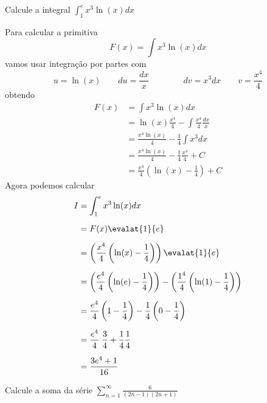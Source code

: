 \documentclass[a4paper,12pt,fleqn]{article}
\begin{document}
Calcule a integral
\(
\int_1^e x^3\ln(x) dx
\)

\begin{answer}
  Para calcular a primitiva
  \[
  F(x) = \int x^3\ln(x) dx
  \]
  vamos usar integração por partes com
  \[
  u = \ln(x) \qquad du = \frac{dx}{x} \qquad\qquad
  dv = x^3dx \qquad v = \frac{x^4}{4}
  \]
  obtendo
  \begin{align*}
    F(x)
    & = \int x^3\ln(x) dx \\[2mm]
    & = \ln(x)\frac{x^4}{4} - \int \frac{x^4}{4} \frac{dx}{x} \\[2mm]
    & = \frac{x^4\ln(x)}{4} - \frac{1}{4} \int x^3 dx  \\[2mm]
    & = \frac{x^4\ln(x)}{4} - \frac{1}{4} \frac{x^4}{4} + C  \\[2mm]
    & = \frac{x^4}{4}\left(\ln(x) - \frac{1}{4}\right) + C
  \end{align*}
  Agora podemos calcular
  \begin{align*}
    I
    & = \int_1^e x^3\ln(x) dx \\[2mm]
    & = F(x)\evalat{1}{e} \\[2mm]
    & = \left(\frac{x^4}{4}\left(\ln(x) - \frac{1}{4}\right)\right)\evalat{1}{e} \\[2mm]
    & = \left(\frac{e^4}{4}\left(\ln(e) - \frac{1}{4}\right)\right)
    - \left(\frac{1^4}{4}\left(\ln(1) - \frac{1}{4}\right)\right) \\[2mm]
    & = \frac{e^4}{4}\left(1 - \frac{1}{4}\right)
    - \frac{1}{4}\left(0 - \frac{1}{4}\right) \\[2mm]
    & = \frac{e^4}{4}\;\frac{3}{4}
    + \frac{1}{4}\frac{1}{4} \\[2mm]
    & = \frac{3e^4+ 1}{16}
  \end{align*}
  \clearpage
\end{answer}


Calcule a soma da série
\(
  \sum_{n=1}^{\infty} \frac{6}{(2n-1)(2n+1)}
\)
\end{document}
